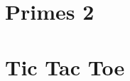 \section{Primes 2} \label{sec:appendix:testsuite:primes2}
\begin{lstfloat}[H]
    
\caption{primes2.bf, \cite{primes2}}
\label{lst:primes2}
\end{lstfloat}

\section{Tic Tac Toe} \label{sec:appendix:testsuite:tictactoe}

\begin{lstfloat}[H]
\caption{tictactoe.bf, \cite{tictactoe}}
\label{lst:tictactoe}
\end{lstfloat}



